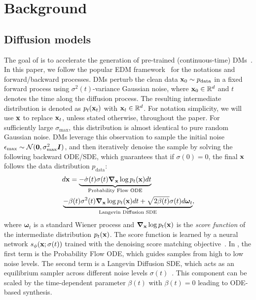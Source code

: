 \section{Background}

\subsection{Diffusion models}
The goal of \methodtext is to accelerate the generation of pre-trained (continuous-time) DMs~\cite{song2020score, ho2020ddpm}. In this paper, we follow the popular EDM framework~\cite{Karras2022ElucidatingTD} for the notations and forward/backward processes. DMs perturb the clean data {${\mathbf{x}}_0 \sim p_{\textrm{data}}$} in a fixed forward process using $\sigma^2(t)$-variance Gaussian noise, where ${\mathbf{x}}_0 \in \mathbb{R}^d$ and $t$ denotes the time along the diffusion process. The resulting intermediate distribution is denoted as $p_t({\mathbf{x}}_t)$ with ${\mathbf{x}}_t \in \mathbb{R}^d$. For notation simplicity, we will use ${\mathbf{x}}$ to replace ${\mathbf{x}}_t$, unless stated otherwise, throughout the paper.
For sufficiently large $\sigma_\textrm{max}$, this distribution is almost identical to pure random Gaussian noise. DMs leverage this observation to sample the initial noise $\epsilon_\text{max} \sim \mathcal{N}( \mathbf{0},\sigma_\textrm{max}^2{\bm{I}})$, and then iteratively denoise the sample by solving the following backward ODE/SDE, which guarantees that if $\sigma(0)=0$, the final ${\mathbf{x}}$ follows the data distribution $p_{\textrm{data}}$:
{\small
\begin{equation}\label{eq:generation_sde}
\begin{split}
    & d{\mathbf{x}} = \underbrace{-\dot{\sigma}(t)\sigma(t)\boldsymbol{\nabla}_{\mathbf{x}} \log p_t({\mathbf{x}}) dt}_{\textrm{Probability Flow ODE}} \\
    &\underbrace{- \beta(t)\sigma^2(t) \boldsymbol{\nabla}_{\mathbf{x}} \log p_t({\mathbf{x}}) dt + \sqrt{2\beta(t)}\sigma(t)d\boldsymbol{\omega}_t}_{\textrm{Langevin Diffusion SDE}},
\end{split}
\end{equation}
}%
where $\boldsymbol{\omega}_t$ is a standard Wiener process and $\boldsymbol{\nabla}_{\mathbf{x}} \log p_t({\mathbf{x}})$ is the \textit{score function} of the intermediate distribution $p_t({\mathbf{x}})$. The score function is learned by a neural network $s_\phi({\mathbf{x}}; \sigma(t))$ trained with the denoising score matching objective~\cite{vincent2011,song2019generative}. In , the first term is the Probability Flow ODE,  which guides samples from high to low noise levels. The second term is a Langevin Diffusion SDE, which acts as an equilibrium sampler across different noise levels $\sigma(t)$~\cite{Karras2022ElucidatingTD, Xu2023RestartSF}. This component can be scaled by the time-dependent parameter $\beta(t)$ with $\beta(t)=0$ leading to ODE-based synthesis. %
